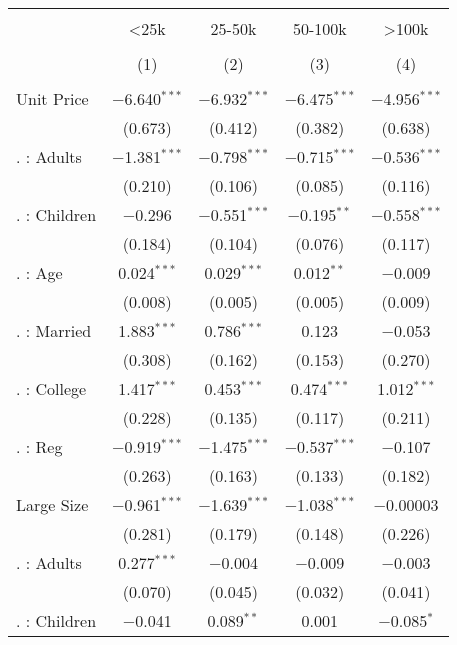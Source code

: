 
\begin{table}[!htbp] \centering 
  \caption{} 
  \label{} 
\begin{tabular}{@{\extracolsep{5pt}}lcccc} 
\\[-1.8ex]\hline 
\hline \\[-1.8ex] 
 & <25k & 25-50k & 50-100k & >100k \\ 
\\[-1.8ex] & (1) & (2) & (3) & (4)\\ 
\hline \\[-1.8ex] 
 Unit Price & $-$6.640$^{***}$ & $-$6.932$^{***}$ & $-$6.475$^{***}$ & $-$4.956$^{***}$ \\ 
  & (0.673) & (0.412) & (0.382) & (0.638) \\ 
  . : Adults & $-$1.381$^{***}$ & $-$0.798$^{***}$ & $-$0.715$^{***}$ & $-$0.536$^{***}$ \\ 
  & (0.210) & (0.106) & (0.085) & (0.116) \\ 
  . : Children & $-$0.296 & $-$0.551$^{***}$ & $-$0.195$^{**}$ & $-$0.558$^{***}$ \\ 
  & (0.184) & (0.104) & (0.076) & (0.117) \\ 
  . : Age & 0.024$^{***}$ & 0.029$^{***}$ & 0.012$^{**}$ & $-$0.009 \\ 
  & (0.008) & (0.005) & (0.005) & (0.009) \\ 
  . : Married & 1.883$^{***}$ & 0.786$^{***}$ & 0.123 & $-$0.053 \\ 
  & (0.308) & (0.162) & (0.153) & (0.270) \\ 
  . : College & 1.417$^{***}$ & 0.453$^{***}$ & 0.474$^{***}$ & 1.012$^{***}$ \\ 
  & (0.228) & (0.135) & (0.117) & (0.211) \\ 
  . : Reg & $-$0.919$^{***}$ & $-$1.475$^{***}$ & $-$0.537$^{***}$ & $-$0.107 \\ 
  & (0.263) & (0.163) & (0.133) & (0.182) \\ 
  Large Size & $-$0.961$^{***}$ & $-$1.639$^{***}$ & $-$1.038$^{***}$ & $-$0.00003 \\ 
  & (0.281) & (0.179) & (0.148) & (0.226) \\ 
  . : Adults & 0.277$^{***}$ & $-$0.004 & $-$0.009 & $-$0.003 \\ 
  & (0.070) & (0.045) & (0.032) & (0.041) \\ 
  . : Children & $-$0.041 & 0.089$^{**}$ & 0.001 & $-$0.085$^{*}$ \\ 

\end{tabular}
\end{table}
